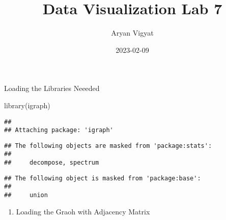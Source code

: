 \documentclass[
]{article}
\title{Data Visualization Lab 7}
\author{Aryan Vigyat}
\date{2023-02-09}
\newenvironment{Shaded}{\begin{snugshade}}{\end{snugshade}}
\newcommand{\FunctionTok}[1]{\textcolor[rgb]{0.00,0.00,0.00}{#1}}
\newcommand{\NormalTok}[1]{#1}
\providecommand{\tightlist}{%
  \setlength{\itemsep}{0pt}\setlength{\parskip}{0pt}}
\begin{document}
\maketitle

Loading the Libraries Neeeded

\begin{Shaded}
\begin{Highlighting}[]
\FunctionTok{library}\NormalTok{(igraph)}
\end{Highlighting}
\end{Shaded}

\begin{verbatim}
## 
## Attaching package: 'igraph'
\end{verbatim}

\begin{verbatim}
## The following objects are masked from 'package:stats':
## 
##     decompose, spectrum
\end{verbatim}

\begin{verbatim}
## The following object is masked from 'package:base':
## 
##     union
\end{verbatim}

\begin{enumerate}
\def\labelenumi{\arabic{enumi}.}
\tightlist
\item
  Loading the Graoh with Adjacency Matrix
\end{enumerate}
\end{document}
